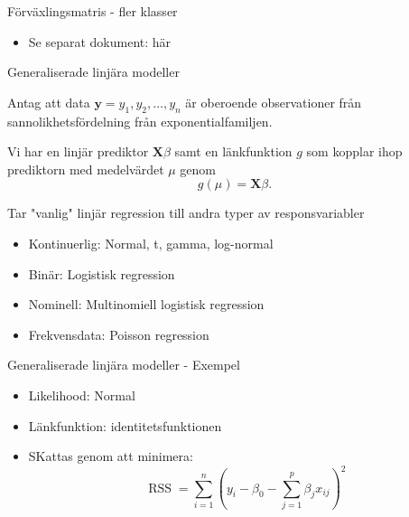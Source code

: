 \documentclass[10pt,english]{beamer}
\begin{document}
\begin{frame}{Förväxlingsmatris - fler klasser}

\begin{itemize}
    \item Se separat dokument: här
\end{itemize}
    
\end{frame}



\begin{frame}{Generaliserade linjära modeller}

    Antag att data $\mathbf{y} = y_1, y_2, \ldots, y_n$ är oberoende observationer från sannolikhetsfördelning från exponentialfamiljen.

    Vi har en linjär prediktor $\mathbf{X} \beta$ samt en länkfunktion $g$ som kopplar ihop prediktorn med medelvärdet $\mu$ genom
    \begin{equation*}
        g(\mu) = \mathbf{X} \beta.
    \end{equation*}
    
    Tar "vanlig" linjär regression till andra typer av responsvariabler
    \begin{itemize}
        \item Kontinuerlig: Normal, t, gamma, log-normal
        \item Binär: Logistisk regression
        \item Nominell: Multinomiell logistisk regression
        \item Frekvensdata: Poisson regression
    \end{itemize}
\end{frame}

\begin{frame}{Generaliserade linjära modeller - Exempel}

    \begin{itemize}
        \item Likelihood: Normal
        \item L\"ankfunktion: identitetsfunktionen
        \item SKattas genom att minimera:
        \begin{equation*}
            \operatorname{RSS} = \sum_{i=1}^{n} \left( y_i - \beta_0 - \sum_{j=1}^{p} \beta_j x_{ij} \right)^2
        \end{equation*}
    \end{itemize}

\end{frame}
\end{document}
